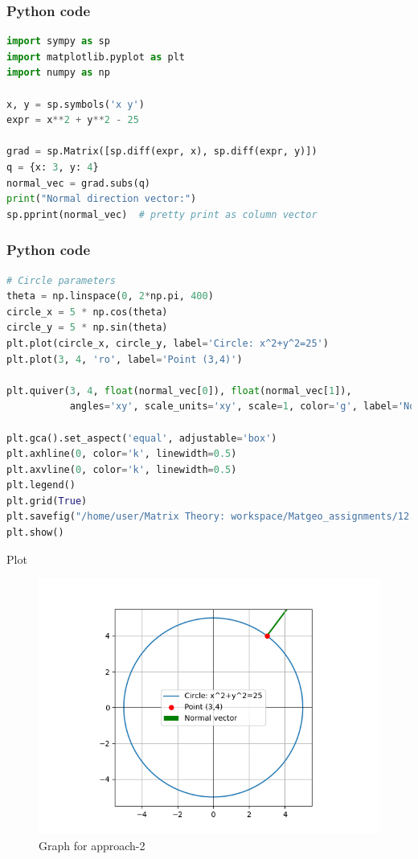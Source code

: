 \documentclass{beamer}
\begin{document}
\begin{frame}[fragile]
    \frametitle{Python code}
    \begin{lstlisting}[language=Python]
import sympy as sp
import matplotlib.pyplot as plt
import numpy as np

x, y = sp.symbols('x y')
expr = x**2 + y**2 - 25

grad = sp.Matrix([sp.diff(expr, x), sp.diff(expr, y)])
q = {x: 3, y: 4}
normal_vec = grad.subs(q)
print("Normal direction vector:")
sp.pprint(normal_vec)  # pretty print as column vector 
    \end{lstlisting}   
\end{frame}

\begin{frame}[fragile]
    \frametitle{Python code}
    \begin{lstlisting}[language=Python]
# Circle parameters
theta = np.linspace(0, 2*np.pi, 400)
circle_x = 5 * np.cos(theta)
circle_y = 5 * np.sin(theta)
plt.plot(circle_x, circle_y, label='Circle: x^2+y^2=25')
plt.plot(3, 4, 'ro', label='Point (3,4)')

plt.quiver(3, 4, float(normal_vec[0]), float(normal_vec[1]),
           angles='xy', scale_units='xy', scale=1, color='g', label='Normal vector')

plt.gca().set_aspect('equal', adjustable='box')
plt.axhline(0, color='k', linewidth=0.5)
plt.axvline(0, color='k', linewidth=0.5)
plt.legend()
plt.grid(True)
plt.savefig("/home/user/Matrix Theory: workspace/Matgeo_assignments/12.560/figs/Figure_2.png")
plt.show()

    \end{lstlisting}   
\end{frame}


\begin{frame}{Plot}
    \begin{figure}[H]
    \centering
    \includegraphics[width=0.7\columnwidth]{figs/Figure_2.png}
    \caption{Graph for approach-2}
    \label{fig:2}
    \end{figure}
\end{frame}
\end{document}
